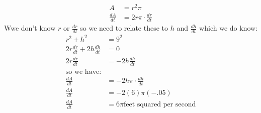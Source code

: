 \documentclass[nooutcomes]{ximera}
\begin{document}
\begin{problem}
\begin{freeResponse}
	\begin{align*}
	A&=r^2\pi\\
	\frac{dA}{dt}&=2r\pi \cdot \frac{dr}{dt} 
	\end{align*}
	Wwe don't know $r$ or $\frac{dr}{dt}$ so we need to relate these to $h$ and $\frac{dh}{dt}$ which we do know:\\
	\begin{align*}
	r^2+h^2&=9^2\\
	2r\frac{dr}{dt}+2h\frac{dh}{dt}&=0\\
	2r\frac{dr}{dt}&=-2h\frac{dh}{dt}\\
	\text{so we have:}&\\
	\frac{dA}{dt}&=-2h\pi \cdot \frac{dh}{dt} \\
	\frac{dA}{dt}&=-2(6)\pi (-.05)\\
	\frac{dA}{dt}&=6\pi \text{feet squared per second}
	\end{align*}

\end{freeResponse}
\end{problem}
\end{document}
